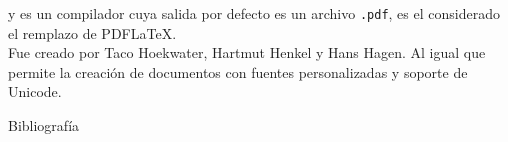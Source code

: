 \documentclass[12pt,aspectratio=43]{beamer}
\newcommand{\lmr}{\fontfamily{lmr}\selectfont}
\begin{document}
\begin{frame}{{\LuaTeX} y {\LuaLaTeX}}{}
{\LuaLaTeX} es un compilador cuya salida por defecto es un archivo {\tt .pdf}, es el considerado el remplazo de {\lmr PDF\LaTeX}.\pause\\[1em]

Fue creado por Taco Hoekwater, Hartmut Henkel y Hans Hagen. Al igual que {\XeLaTeX} permite la creación de documentos con fuentes personalizadas y soporte de Unicode.
\end{frame}

\begin{frame}[allowframebreaks]{Bibliografía}
\nocite{*}
\printbibliography
\end{frame}
\end{document}
